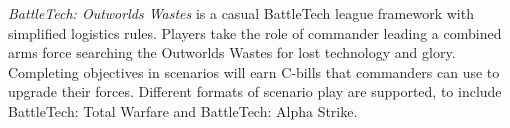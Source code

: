 \emph{BattleTech: Outworlds Wastes} is a casual BattleTech league framework with simplified logistics rules.
Players take the role of commander leading a combined arms force searching the Outworlds Wastes for lost technology and glory.
Completing objectives in scenarios will earn C-bills that commanders can use to upgrade their forces.
Different formats of scenario play are supported, to include BattleTech: Total Warfare and BattleTech: Alpha Strike.
